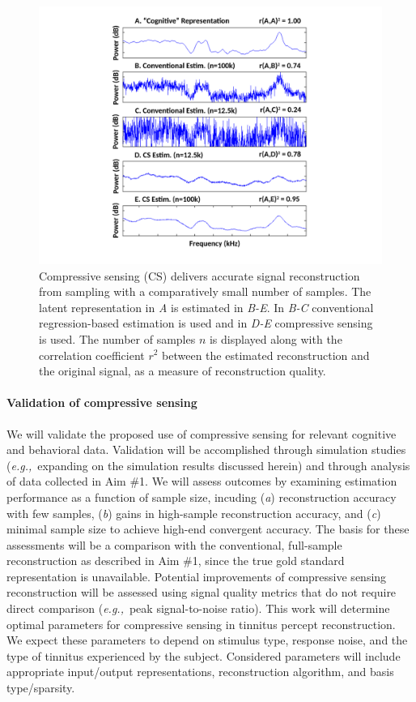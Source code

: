 \documentclass[11pt, notitlepage]{article} %
\def\eg{{\emph{e.g.,}}~}
\begin{document}
\begin{figure}[h] %
	\centering
	\includegraphics[width=\textwidth]{Figures/CompSensExamples.pdf}
	\caption{Compressive sensing (CS) delivers accurate signal reconstruction from sampling
	with a comparatively small number of samples.
	The latent representation in \emph{A} is estimated in \emph{B-E}.
	In \emph{B-C} conventional regression-based estimation is used
	and in \emph{D-E} compressive sensing is used.
	The number of samples $n$ is displayed along with the correlation coefficient $r^2$
	between the estimated reconstruction and the original signal,
	as a measure of reconstruction quality.}
	\label{fig:csexample}
\end{figure}

\paragraph{Validation of compressive sensing}

We will validate the proposed use of compressive sensing for relevant
cognitive and behavioral data.
Validation will be accomplished through simulation studies
(\eg expanding on the simulation results discussed herein)
and through analysis of data collected in Aim \#1.
We will assess outcomes by examining estimation performance
as a function of sample size,
incuding
(\emph{a}) reconstruction accuracy with few samples,
(\emph{b}) gains in high-sample reconstruction accuracy, and
(\emph{c}) minimal sample size to achieve high-end convergent accuracy.
The basis for these assessments will be a comparison
with the conventional, full-sample reconstruction
as described in Aim \#1,
since the true gold standard representation is unavailable.
Potential improvements of compressive sensing reconstruction
will be assessed using signal quality metrics that do not require direct comparison
(\eg peak signal-to-noise ratio).
This work will determine optimal parameters for compressive sensing
in tinnitus percept reconstruction.
We expect these parameters to depend on stimulus type, response noise,
and the type of tinnitus experienced by the subject.
Considered parameters will include appropriate input/output representations,
reconstruction algorithm, and basis type/sparsity.
\end{document}
